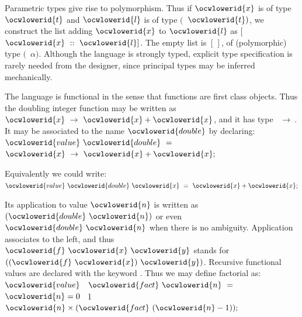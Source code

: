 \documentclass[12pt]{article}
\begin{document}
\ocwendcode{}\ocwindent{0.00em}
Parametric types give rise to polymorphism.
Thus if \ocwbegindcode{}$\ocwlowerid{x}$\ocwenddcode{} is of type \ocwbegindcode{}$\ocwlowerid{t}$\ocwenddcode{} and \ocwbegindcode{}$\ocwlowerid{l}$\ocwenddcode{} is of type 
\ocwbegindcode{}$($~$\ocwlowerid{t})$\ocwenddcode{}, we construct the list adding \ocwbegindcode{}$\ocwlowerid{x}$\ocwenddcode{} to \ocwbegindcode{}$\ocwlowerid{l}$\ocwenddcode{}
as \ocwbegindcode{}[$\ocwlowerid{x}~::~\ocwlowerid{l}]$\ocwenddcode{}. The empty list is \ocwbegindcode{}$[\,]$\ocwenddcode{}, of (polymorphic) type
\ocwbegindcode{}$($~$\alpha{})$\ocwenddcode{}. Although the language is strongly typed, explicit type
specification is rarely needed from the designer, since principal types
may be inferred mechanically.

The language is functional in the sense that functions are first class
objects. Thus the doubling integer function may be written as
\ocwbegindcode{}~$\ocwlowerid{x}~\rightarrow{}~\ocwlowerid{x}+\ocwlowerid{x}$\ocwenddcode{}, and it has type \ocwbegindcode{}~$\rightarrow{}~$\ocwenddcode{}. It may be associated
to the name \ocwbegindcode{}$\ocwlowerid{double}$\ocwenddcode{} by declaring: 
\ocweol
\label{../ML/pidgin.ml:1737}%
\medskip
\ocwbegincode{}\ocwindent{0.00em}
$\ocwlowerid{value}~\ocwlowerid{double}~=~$~$\ocwlowerid{x}~\rightarrow{}~\ocwlowerid{x}+\ocwlowerid{x};$\medskip

\ocwendcode{}\ocwindent{0.00em}
Equivalently we could write: 
\ocweol
\label{../ML/pidgin.ml:1802}%
\medskip
\ocwbegincode{}\ocwindent{0.00em}
$\ocwlowerid{value}~\ocwlowerid{double}~\ocwlowerid{x}~=~\ocwlowerid{x}+\ocwlowerid{x};$\medskip

\ocwendcode{}\ocwindent{0.00em}
Its application to value \ocwbegindcode{}$\ocwlowerid{n}$\ocwenddcode{}
is written as \ocwbegindcode{}$(\ocwlowerid{double}~\ocwlowerid{n})$\ocwenddcode{} or even \ocwbegindcode{}$\ocwlowerid{double}~\ocwlowerid{n}$\ocwenddcode{} when there is no
ambiguity. Application associates to the left, and thus \ocwbegindcode{}$\ocwlowerid{f}~\ocwlowerid{x}~\ocwlowerid{y}$\ocwenddcode{} stands
for \ocwbegindcode{}$((\ocwlowerid{f}~\ocwlowerid{x})~\ocwlowerid{y})$\ocwenddcode{}. 
Recursive functional values are declared with the keyword \ocwbegindcode{}\ocwenddcode{}.
Thus we may define factorial as: 
\ocweol
\label{../ML/pidgin.ml:2111}%
\medskip
\ocwbegincode{}\ocwindent{0.00em}
$\ocwlowerid{value}~$~$\ocwlowerid{fact}~\ocwlowerid{n}~=~$~$\ocwlowerid{n}=0~$~1~~$\ocwlowerid{n}\times{}(\ocwlowerid{fact}~(\ocwlowerid{n}-1));$\medskip
\end{document}
